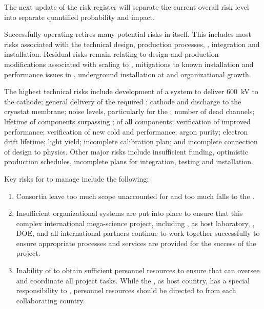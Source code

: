 The next update of the risk register will separate the current overall
risk level into separate quantified probability and impact.

Successfully operating  retires many
potential risks in  itself. This includes most risks associated with the
technical design, production processes, , integration
and installation. Residual risks remain relating to design and
production modifications associated with scaling to , mitigations
to known installation and performance issues in , underground
installation at \surf and organizational growth.

The highest technical risks include development of a system to
deliver \SI{600}{kV} to the \dual cathode; general delivery of the
required ; cathode and  discharge to the cryostat
membrane; noise levels, particularly for the ; %
number of dead channels; lifetime of components surpassing \dunelifetime{}; %
 of all components; verification of improved 
performance; verification of new cold   and   performance;
argon purity; electron drift lifetime; \phel light yield;
incomplete calibration plan; and incomplete connection of design to
physics. Other major risks include insufficient funding, optimistic
production schedules, incomplete plans for integration, testing and installation.

Key risks for  to manage include the following:
\begin{enumerate}
\item Consortia leave too much scope unaccounted for and too much falls
  to  the .
\item Insufficient organizational systems are put into place to
  ensure that this complex international mega-science project,
  including , \fnal as host laboratory, \surf, DOE, and all international
  partners continue to work together successfully to ensure
  appropriate processes and services are provided for the success of
  the project.
\item Inability of  to obtain sufficient personnel resources to
  ensure that  can oversee and coordinate all project tasks.  While the , 
  as host country, has a special responsibility to , personnel resources should
  be directed to  from each collaborating country. 
\end{enumerate}


